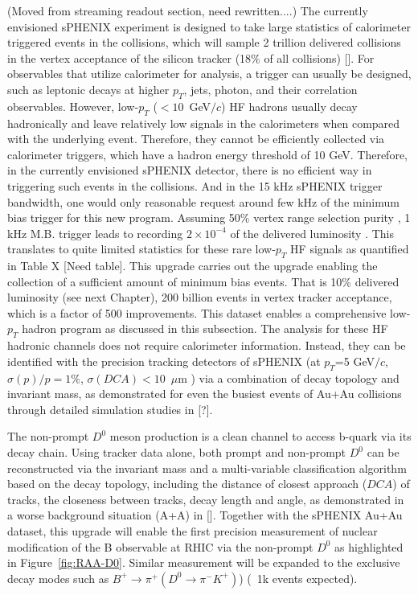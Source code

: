 (Moved from streaming readout section, need rewritten....)
The currently envisioned sPHENIX experiment is designed to take large statistics of calorimeter triggered events in the \pp collisions, which will sample 2 trillion delivered \pp collisions in the vertex acceptance of the silicon tracker (18\% of all collisions) []. For observables that utilize calorimeter for analysis, a trigger can usually be designed, such as leptonic decays at higher $p_T$, jets, photon, and their correlation observables. However, low-$p_T$  ($<10$~GeV$/c$) HF hadrons usually decay hadronically and leave relatively low signals in the calorimeters when compared with the underlying event. Therefore, they cannot be efficiently collected via calorimeter triggers, which have a hadron energy threshold of 10 GeV. Therefore, in the currently envisioned sPHENIX detector, there is no efficient way in triggering such events in the \pp collisions. And in the 15 kHz sPHENIX trigger bandwidth, one would only reasonable request around few kHz of the minimum bias \pp trigger for this new program. Assuming 50\% vertex range selection purity , 1 kHz M.B. trigger leads to recording $2\times10^{-4}$ of the delivered luminosity . This translates to quite limited statistics for these rare low-$p_T$ HF signals as quantified in Table X [Need table].
This upgrade carries out the upgrade enabling the collection of a sufficient amount of minimum bias \pp events. That is 10\% delivered luminosity (see next Chapter), 200 billion events in vertex tracker acceptance, which is a factor of 500 improvements. This dataset enables a comprehensive low-$p_T$ hadron program as discussed in this subsection. The analysis for these HF hadronic channels does not require calorimeter information. Instead, they can be identified with the precision tracking detectors of sPHENIX (at $p_T$=5 GeV$/c$, $\sigma(p)/p=1\%$, $\sigma(DCA)<10$~$\mu$m ) via a combination of decay topology and invariant mass, as demonstrated for even the busiest events of Au+Au collisions through detailed simulation studies in [?]. 
 
The non-prompt $D^0$ meson production is a clean channel to access b-quark via its decay chain. Using tracker data alone, both prompt and non-prompt $D^0$ can be reconstructed via the invariant mass and a multi-variable classification algorithm based on the decay topology, including the distance of closest approach ($DCA$) of tracks, the closeness between tracks, decay length and angle, as demonstrated in a worse background situation (A+A) in []. Together with the sPHENIX Au+Au dataset, this upgrade will enable the first precision measurement of nuclear modification of the B observable at RHIC via the non-prompt $D^0$ as highlighted in Figure~\ref{fig:RAA-D0}. Similar measurement will be expanded to the exclusive decay modes such as $B^+ \rightarrow \pi^+ (D^0 \rightarrow \pi^- K^+)$) (~1k events expected).

